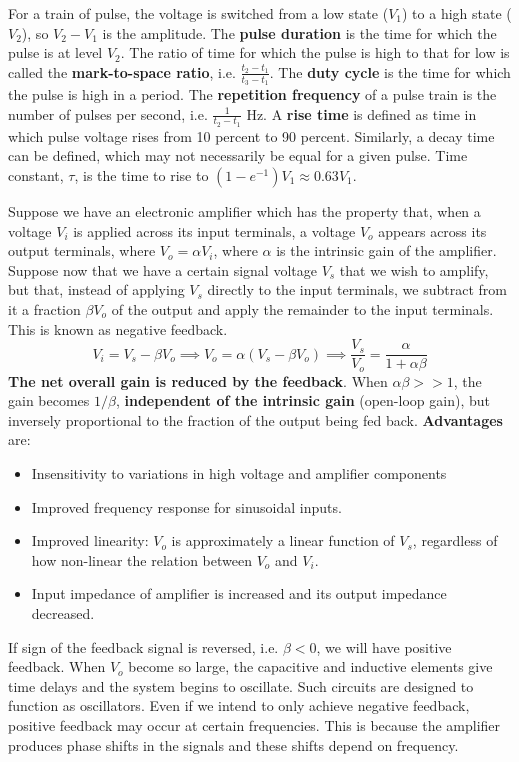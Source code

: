 \documentclass[a4paper]{article}
\begin{document}
\newpage
\begin{Note}
For a train of pulse, the voltage is switched from a low state ($V_1$) to a high state ($V_2$), so $V_2-V_1$ is the amplitude. The \textbf{pulse duration} is the time for which the pulse is at level $V_2$. The ratio of time for which the pulse is high to that for low is called the \textbf{mark-to-space ratio}, i.e. $\frac{t_2-t_1}{t_3-t_1}$. The \textbf{duty cycle} is the time for which the pulse is high in a period. The \textbf{repetition frequency} of a pulse train is the number of pulses per second, i.e. $\frac{1}{t_2-t_1}$ Hz. A \textbf{rise time} is defined as time in which pulse voltage rises from 10 percent to 90 percent. Similarly, a decay time can be defined, which may not necessarily be equal for a given pulse. Time constant, $\tau$, is the time to rise to $(1-e^{-1})V_1\approx0.63V_1$.~\cite{ahmed_spreadbury_1984}
\end{Note}
\begin{Note}[Feedback]
Suppose we have an electronic amplifier which has the property that, when a voltage $V_i$ is applied across its input terminals, a voltage $V_o$ appears across its output terminals, where $V_o=\alpha V_i$, where $\alpha$ is the intrinsic gain of the amplifier.\\[5pt]
Suppose now that we have a certain signal voltage $V_s$ that we wish to amplify, but that, instead of applying $V_s$ directly to the input terminals, we subtract from it a fraction $\beta V_o$ of the output and apply the remainder to the input terminals. This is known as negative feedback. 
$$V_i=V_s-\beta V_o\implies V_o=\alpha(V_s-\beta V_o)\implies\frac{V_s}{V_o}=\frac{\alpha}{1+\alpha\beta}$$
\textbf{The net overall gain is reduced by the feedback}. When $\alpha\beta>>1$, the gain becomes $1/\beta$, \textbf{independent of the intrinsic gain} (open-loop gain), but inversely proportional to the fraction of the output being fed back. \textbf{Advantages} are:
\begin{itemize}
    \item Insensitivity to variations in high voltage and amplifier components
    \item Improved frequency response for sinusoidal inputs. 
    \item Improved linearity: $V_o$ is approximately a linear function of $V_s$, regardless of how non-linear the relation between $V_o$ and $V_i$.
    \item Input impedance of amplifier is increased and its output impedance decreased.
\end{itemize}
If sign of the feedback signal is reversed, i.e. $\beta<0$, we will have positive feedback. When $V_o$ become so large, the capacitive and inductive elements give time delays and the system begins to oscillate. Such circuits are designed to function as oscillators. Even if we intend to only achieve negative feedback, positive feedback may occur at certain frequencies. This is because the amplifier produces phase shifts in the signals and these shifts depend on frequency.~\cite{ahmed_spreadbury_1984,10.5555/2960712}
\end{Note}
\end{document}
